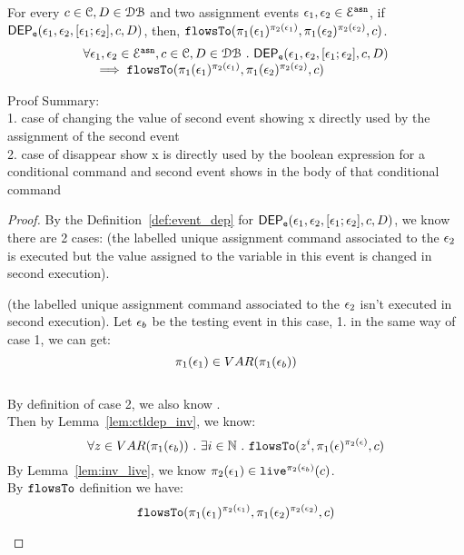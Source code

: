 \begin{lem}
	\label{lem:flowsto_soundness_emptytrace}
	For every $ c \in \mathcal{C}, D \in \mathcal{DB}$ and two assignment events $\mathtt{\epsilon}_1, \mathtt{\epsilon}_2 \in \mathcal{E}^{\mathtt{{asn}}}$,
	if $\mathsf{DEP_{\mathtt{e}}}(\mathtt{\epsilon}_1, \mathtt{\epsilon}_2, [\mathtt{\epsilon}_1; \mathtt{\epsilon}_2],  c, D) $,
	then, $\mathtt{flowsTo}(\pi_1(\mathtt{\epsilon}_1)^{\pi_2(\mathtt{\epsilon}_1)}, \pi_1(\mathtt{\epsilon}_2)^{\pi_2(\mathtt{\epsilon}_2)}, c)$.
	\[
	\begin{array}{l}
		\forall \mathtt{\epsilon}_1, \mathtt{\epsilon}_2 \in \mathcal{E}^{\mathtt{{asn}}}, c \in \mathcal{C}, D \in \mathcal{DB} 
		~.~ 
		\mathsf{DEP_{\mathtt{e}}}(\mathtt{\epsilon}_1, \mathtt{\epsilon}_2, [\mathtt{\epsilon}_1; \mathtt{\epsilon}_2],  c, D) 
		\\ \quad 
		\implies 
		\mathtt{flowsTo}(\pi_1(\mathtt{\epsilon}_1)^{\pi_2(\mathtt{\epsilon}_1)}, \pi_1(\mathtt{\epsilon}_2)^{\pi_2(\mathtt{\epsilon}_2)}, c)
	\end{array}
	\]
\end{lem}
Proof Summary:
\\
1. case of changing the value of second event 
showing x directly used by the assignment of the second event
\\
2. case of disappear
show x is directly used by the boolean expression for a conditional command and second event shows in the body of that conditional command 
%
\begin{proof}
	By the Definition~\ref{def:event_dep} for $\mathsf{DEP_{\mathtt{e}}}(\mathtt{\epsilon}_1, \mathtt{\epsilon}_2, [\mathtt{\epsilon}_1; \mathtt{\epsilon}_2], c, D)$, 
	we know there are 2 cases:
	\caseL
		(the labelled unique assignment command associated to the $\mathtt{\epsilon}_2$ 
		is executed but the value assigned to the variable in this event is changed in second execution).
	
	\begin{case}
		(the labelled unique assignment command associated to the $\mathtt{\epsilon}_2$ isn't executed in second execution).
		Let $\mathtt{\epsilon}_b$ be the testing event  in this case,
		1. in the same way of case 1, we can get:
		\[\pi_1(\mathtt{\epsilon}_1) \in VAR(\pi_1(\mathtt{\epsilon}_b)) \]
		\\
		By definition of case 2, we also know .
		\\
		Then by Lemma~\ref{lem:ctldep_inv}, we know:
		\[
			\forall z \in VAR(\pi_1(\mathtt{\epsilon}_b)) ~.~ \exists i \in \mathbb{N} ~.~
		\mathtt{flowsTo}(z^i, \pi_1(\mathtt{\epsilon})^{\pi_2(\mathtt{\epsilon})}, c)
		\]
		By Lemma~\ref{lem:inv_live}, we know $\pi_2(\mathtt{\epsilon}_1) \in \mathtt{live}^{\pi_2(\mathtt{\epsilon}_b)}(c)$.
		\\
		By $\mathtt{flowsTo}$ definition we have:
		\[
			\mathtt{flowsTo}(\pi_1(\mathtt{\epsilon}_1)^{\pi_2(\mathtt{\epsilon}_1)}, \pi_1(\mathtt{\epsilon}_2)^{\pi_2(\mathtt{\epsilon}_2)}, c)
		\]
		\end{case}
\end{proof}
